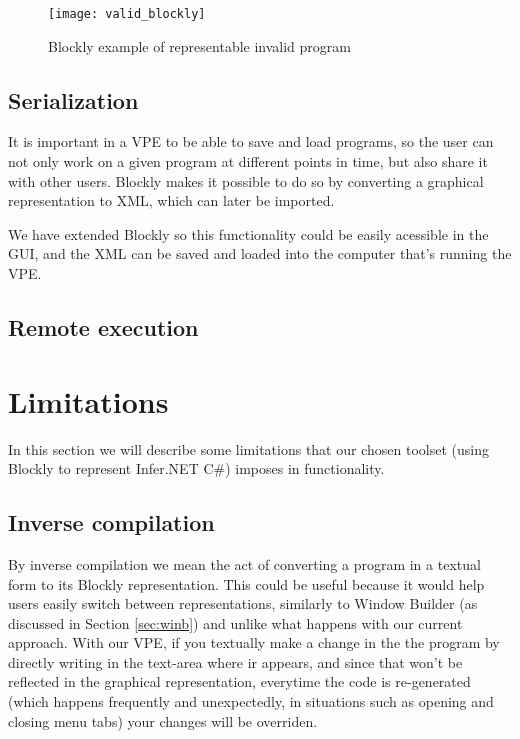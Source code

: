 \begin{figure}[t]
  \begin{center}
    \leavevmode
    \texttt{[image: valid\_blockly]}
    \caption{Blockly example of representable invalid program}
    \label{fig:valid_blockly}
  \end{center}
\end{figure}

\subsection{Serialization}

It is important in a VPE to be able to save and load programs, so the user can
not only work on a given program at different points in time, but also share it
with other users. Blockly makes it possible to do so by converting a graphical
representation to XML, which can later be imported.

We have extended Blockly so this functionality could be easily acessible in the
GUI, and the XML can be saved and loaded into the computer that's running the VPE.

\subsection{Remote execution}

\section{Limitations}

In this section we will describe some limitations that our chosen toolset (using
Blockly to represent Infer.NET C#) imposes in functionality.

\subsection{Inverse compilation}

By inverse compilation we mean the act of converting a program in a textual form
to its Blockly representation. This could be useful because it would help users
easily switch between representations, similarly to Window Builder (as discussed in Section \ref{sec:winb})
and unlike what happens with our current approach.
With our VPE, if you textually make a change in the the program by directly
writing in the text-area where ir appears,
and since that won't be reflected in the graphical representation, everytime
the code is re-generated (which happens frequently and unexpectedly, in situations
such as opening and closing menu tabs) your changes will be overriden.

